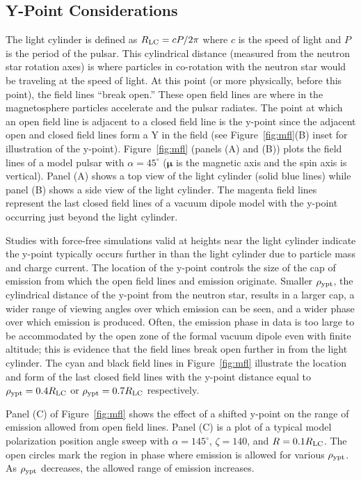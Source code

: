 \subsection{Y-Point Considerations}
\label{sec:ypt}
The light cylinder is defined as $R_{\rm{LC}}=cP/2\pi$ where
$c$ is the speed of light and $P$ is the period of the pulsar.
This cylindrical distance (measured from the neutron
star rotation axes) is where particles in co-rotation with the
neutron star would be traveling at the speed of light.
At this point (or more physically, before this point), the 
field lines ``break open.''  These open field lines are where
in the magnetosphere particles accelerate and the pulsar radiates. 
The point at which an open field line
is adjacent to a closed field line is
the y-point since the adjacent open and closed field lines
form a Y in the field (see Figure~\ref{fig:mfl}(B) inset
for illustration of the y-point).  Figure~\ref{fig:mfl}
(panels (A) and (B)) plots the field lines of a model pulsar with $\alpha=45^\circ$ 
($\boldsymbol{\mu}$ is the magnetic axis and the spin axis is vertical). 
Panel (A) shows a top view of the light cylinder (solid blue lines)
while panel (B) shows a side view of the light cylinder.  The magenta
field lines represent the last closed field lines of a vacuum dipole
model with the y-point occurring just beyond the light cylinder. 

Studies with
force-free simulations \citep{spitkovsky2006time} valid at heights near
the light cylinder indicate the y-point typically occurs
further in than the light cylinder due to particle mass and 
charge current.  The location
of the y-point controls the size of the cap of emission from 
which the open field lines and emission originate.  Smaller $\rho_{\rm{ypt}}$,
the cylindrical distance of the y-point from the neutron star, results in a larger
cap, a wider range of viewing angles over which emission can be seen, and a wider phase over which
emission is produced.  Often, the emission phase in data
is too large to be accommodated by the open
zone of the formal vacuum dipole even with finite altitude;
this is evidence that the field lines break open further in from
the light cylinder. The cyan
and black field lines in Figure~\ref{fig:mfl} illustrate the location and form
of the last closed field lines with the y-point distance equal to
$\rho_{\rm{ypt}}=0.4R_{\rm{LC}}$ or $\rho_{\rm{ypt}}=0.7R_{\rm{LC}}$ respectively.

Panel (C) of Figure~\ref{fig:mfl} shows the effect of a shifted y-point on the range of emission allowed from open field lines.
Panel (C) is a plot of a typical model polarization position angle sweep with $\alpha=145^\circ$,
$\zeta=140$, and $R=0.1R_{\rm{LC}}$.  The open circles mark the region in phase where emission is allowed
for various $\rho_{\rm{ypt}}$.  As $\rho_{\rm{ypt}}$ decreases, the allowed range of emission increases.


